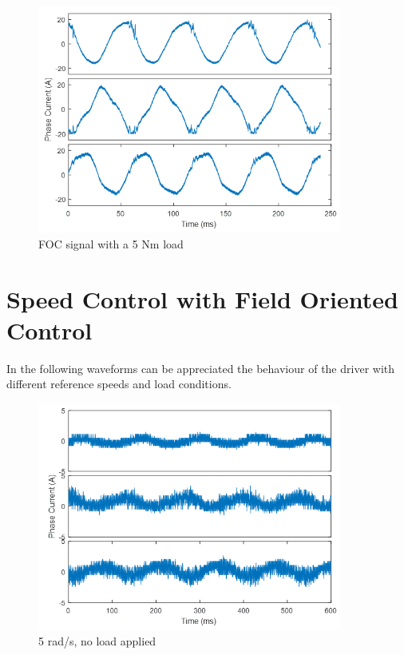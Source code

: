 \begin{figure}[h!p]
\centering
\includegraphics[width=10cm]{Images/waveforms/sin6.png} 
\caption[sin6]{FOC signal with a 5 Nm load}
\label{fig:sin6}
\end{figure}

\clearpage
\section{Speed Control with Field Oriented Control}

In the following waveforms can be appreciated the behaviour of the driver with different reference speeds and load conditions.

\begin{figure}[h!p]
\centering
\includegraphics[width=10cm]{Images/waveforms/sin7.png} 
\caption[sin7]{5 rad/s, no load applied}
\label{fig:sin7}
\end{figure}

